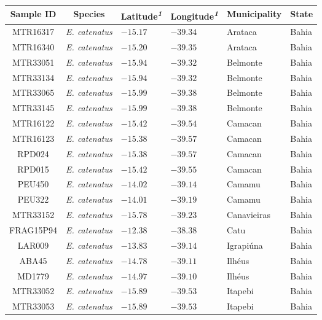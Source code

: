\setlength{\LTpost}{0mm}
\begin{longtable}{cc>{\centering\arraybackslash}p{100px}>{\centering\arraybackslash}p{100px}>{\centering\arraybackslash}p{100px}>{\centering\arraybackslash}p{100px}}
\toprule
Sample ID & Species & Latitude\textsuperscript{\textit{1}} & Longitude\textsuperscript{\textit{1}} & Municipality & State \\ 
\midrule\addlinespace[2.5pt]
MTR16317 & \emph{E. catenatus} & $-15.17$ & $-39.34$ & Arataca & Bahia \\ 
MTR16340 & \emph{E. catenatus} & $-15.20$ & $-39.35$ & Arataca & Bahia \\ 
MTR33051 & \emph{E. catenatus} & $-15.94$ & $-39.32$ & Belmonte & Bahia \\ 
MTR33134 & \emph{E. catenatus} & $-15.94$ & $-39.32$ & Belmonte & Bahia \\ 
MTR33065 & \emph{E. catenatus} & $-15.99$ & $-39.38$ & Belmonte & Bahia \\ 
MTR33145 & \emph{E. catenatus} & $-15.99$ & $-39.38$ & Belmonte & Bahia \\ 
MTR16122 & \emph{E. catenatus} & $-15.42$ & $-39.54$ & Camacan & Bahia \\ 
MTR16123 & \emph{E. catenatus} & $-15.38$ & $-39.57$ & Camacan & Bahia \\ 
RPD024 & \emph{E. catenatus} & $-15.38$ & $-39.57$ & Camacan & Bahia \\ 
RPD015 & \emph{E. catenatus} & $-15.42$ & $-39.55$ & Camacan & Bahia \\ 
PEU450 & \emph{E. catenatus} & $-14.02$ & $-39.14$ & Camamu & Bahia \\ 
PEU322 & \emph{E. catenatus} & $-14.01$ & $-39.19$ & Camamu & Bahia \\ 
MTR33152 & \emph{E. catenatus} & $-15.78$ & $-39.23$ & Canavieiras & Bahia \\ 
FRAG15P94 & \emph{E. catenatus} & $-12.38$ & $-38.38$ & Catu & Bahia \\ 
LAR009 & \emph{E. catenatus} & $-13.83$ & $-39.14$ & Igrapiúna & Bahia \\ 
ABA45 & \emph{E. catenatus} & $-14.78$ & $-39.11$ & Ilhéus & Bahia \\ 
MD1779 & \emph{E. catenatus} & $-14.97$ & $-39.10$ & Ilhéus & Bahia \\ 
MTR33052 & \emph{E. catenatus} & $-15.89$ & $-39.53$ & Itapebi & Bahia \\ 
MTR33053 & \emph{E. catenatus} & $-15.89$ & $-39.53$ & Itapebi & Bahia \\ 

\end{longtable}
